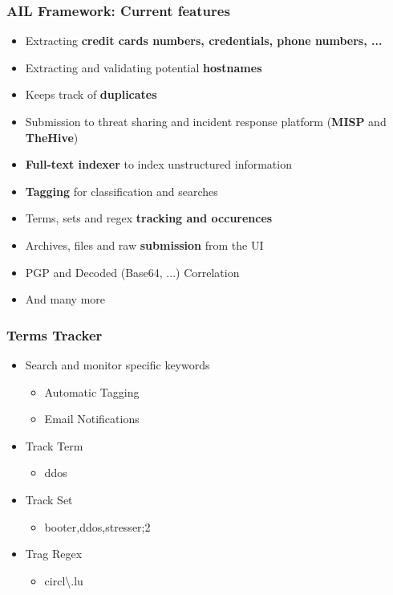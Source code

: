 \documentclass{beamer}
\begin{document}
\begin{frame}
    \frametitle{AIL Framework: Current features}
    \begin{itemize}
        \item Extracting \textbf{credit cards numbers, credentials, phone numbers, ...}
        \item Extracting and validating potential \textbf{hostnames}
        \item Keeps track of \textbf{duplicates}
        \item Submission to threat sharing and incident response platform (\textbf{MISP} and \textbf{TheHive})
        \item \textbf{Full-text indexer} to index unstructured information
        \item \textbf{Tagging} for classification and searches
        \item Terms, sets and regex \textbf{tracking and occurences}
        \item Archives, files and raw \textbf{submission} from the UI
        \item PGP and Decoded (Base64, ...) Correlation
        \item And many more
    \end{itemize}
\end{frame}


\begin{frame}
    \frametitle{Terms Tracker}
        \begin{itemize}
        	\item Search and monitor specific keywords
        	\begin{itemize}
            	\item Automatic Tagging
            	\item Email Notifications
            \end{itemize}
            \item Track Term
            \begin{itemize}
            	\item ddos
            \end{itemize}
            \item Track Set
            \begin{itemize}
            	\item booter,ddos,stresser;2
            \end{itemize}
            \item Trag Regex
            \begin{itemize}
            	\item circl\textbackslash.lu

            \end{itemize}
        \end{itemize}
\end{frame}
\end{document}
